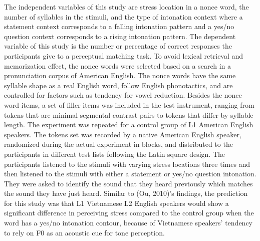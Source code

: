 \documentclass[a4paper]{article}
\begin{document}
The independent variables of this study are stress location in a nonce word, the number of syllables in the stimuli, and the type of intonation context where a statement context corresponds to a falling intonation pattern and a yes/no question context corresponds to a rising intonation pattern. The dependent variable of this study is the number or percentage of correct responses the participants give to a perceptual matching task. To avoid lexical retrieval and memorization effect, the nonce words were selected based on a search in a pronunciation corpus of American English. The nonce words have the same syllable shape as a real English word, follow English phonotactics, and are controlled for factors such as tendency for vowel reduction. Besides the nonce word items, a set of filler items was included in the test instrument, ranging from tokens that are minimal segmental contrast pairs to tokens that differ by syllable length. The experiment was repeated for a control group of L1 American English speakers. The tokens set was recorded by a native American English speaker, randomized during the actual experiment in blocks, and distributed to the participants in different test lists following the Latin square design. The participants listened to the stimuli with varying stress locations three times and then listened to the stimuli with either a statement or yes/no question intonation. They were asked to identify the sound that they heard previously which matches the sound they have just heard. Similar to (Ou, 2010)'s findings, the prediction for this study was that L1 Vietnamese L2 English speakers would show a significant difference in perceiving stress compared to the control group when the word has a yes/no intonation contour, because of Vietnamese speakers' tendency to rely on F0 as an acoustic cue for tone perception.  \\

{}
\end{document}
